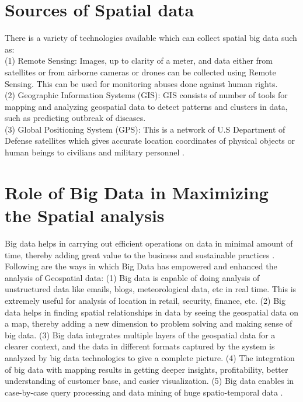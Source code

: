 \section{Sources of Spatial data}
There is a variety of technologies available which can collect spatial big data such as: \\
(1) Remote Sensing: Images, up to clarity of a meter, and data either from satellites or from airborne cameras or drones can be collected using Remote Sensing. This can be used for monitoring abuses done against human rights.\\
(2) Geographic Information Systems (GIS): GIS consists of number of tools for mapping and analyzing geospatial data to detect patterns and clusters in data, such as predicting outbreak of diseases.\\
(3) Global Positioning System (GPS): This is a network of U.S Department of Defense satellites which gives accurate location coordinates of physical objects or human beings to civilians and military personnel \cite{link6}.

\section{Role of Big Data in Maximizing the Spatial analysis}
Big data helps in carrying out efficient operations on data in minimal amount of time, thereby adding great value to the business and sustainable practices \cite{link10}. Following are the ways in which Big Data has empowered and enhanced the analysis of Geospatial data:
(1) Big data is capable of doing analysis of unstructured data like emails, blogs, meteorological data, etc in real time. This is extremely useful for analysis of location in retail, security, finance, etc.
(2) Big data helps in finding spatial relationships in data by seeing the geospatial data on a map, thereby adding a new dimension to problem solving and making sense of big data.
(3) Big data integrates multiple layers of the geospatial data for a clearer context, and the data in different formats captured by the system is analyzed by big data technologies to give a complete picture.
(4) The integration of big data with mapping results in getting deeper insights, profitability, better understanding of customer base, and easier visualization.
(5) Big data enables in case-by-case query processing and data mining of huge spatio-temporal data \cite{link10}.

